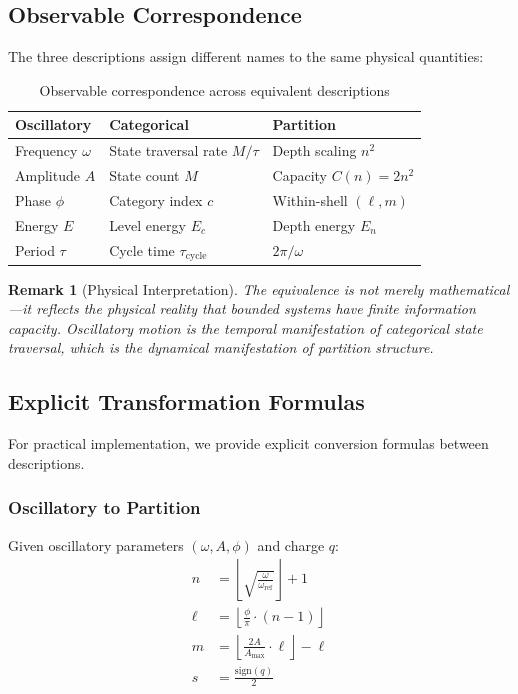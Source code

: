 \documentclass[twocolumn,10pt]{article}
\newtheorem{remark}[theorem]{Remark}
\begin{document}
\subsection{Observable Correspondence}

The three descriptions assign different names to the same physical quantities:

\begin{table}[h]
\centering
\caption{Observable correspondence across equivalent descriptions}
\label{tab:observables}
\begin{tabular}{lll}
\toprule
\textbf{Oscillatory} & \textbf{Categorical} & \textbf{Partition} \\
\midrule
Frequency $\omega$ & State traversal rate $M/\tau$ & Depth scaling $n^2$ \\
Amplitude $A$ & State count $M$ & Capacity $C(n) = 2n^2$ \\
Phase $\phi$ & Category index $c$ & Within-shell $(\ell, m)$ \\
Energy $E$ & Level energy $E_c$ & Depth energy $E_n$ \\
Period $\tau$ & Cycle time $\tau_{\mathrm{cycle}}$ & $2\pi/\omega$ \\
\bottomrule
\end{tabular}
\end{table}

\begin{remark}[Physical Interpretation]
The equivalence is not merely mathematical---it reflects the \emph{physical reality} that bounded systems have finite information capacity. Oscillatory motion is the temporal manifestation of categorical state traversal, which is the dynamical manifestation of partition structure.
\end{remark}

\subsection{Explicit Transformation Formulas}

For practical implementation, we provide explicit conversion formulas between descriptions.

\subsubsection{Oscillatory to Partition}

Given oscillatory parameters $(\omega, A, \phi)$ and charge $q$:
\begin{align}
n &= \left\lfloor \sqrt{\frac{\omega}{\omega_{\mathrm{ref}}}} \right\rfloor + 1 \\
\ell &= \left\lfloor \frac{\phi}{\pi} \cdot (n-1) \right\rfloor \\
m &= \left\lfloor \frac{2A}{A_{\max}} \cdot \ell \right\rfloor - \ell \\
s &= \frac{\mathrm{sign}(q)}{2}
\end{align}
\end{document}
